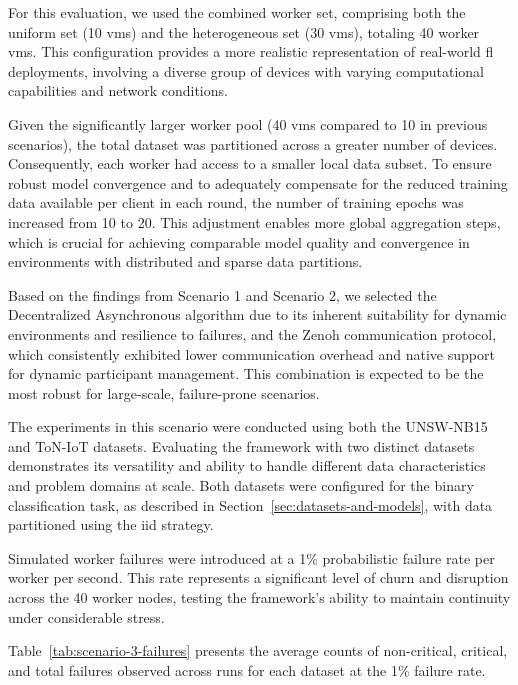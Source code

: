 For this evaluation, we used the combined worker set, comprising both the uniform set (10 \acp{vm}) and the heterogeneous set (30 \acp{vm}), totaling 40 worker \acp{vm}. This configuration provides a more realistic representation of real-world \ac{fl} deployments, involving a diverse group of devices with varying computational capabilities and network conditions.

Given the significantly larger worker pool (40 \acp{vm} compared to 10 in previous scenarios), the total dataset was partitioned across a greater number of devices. Consequently, each worker had access to a smaller local data subset. To ensure robust model convergence and to adequately compensate for the reduced training data available per client in each round, the number of training epochs was increased from 10 to 20. This adjustment enables more global aggregation steps, which is crucial for achieving comparable model quality and convergence in environments with distributed and sparse data partitions.

Based on the findings from Scenario 1 and Scenario 2, we selected the Decentralized Asynchronous algorithm due to its inherent suitability for dynamic environments and resilience to failures, and the Zenoh communication protocol, which consistently exhibited lower communication overhead and native support for dynamic participant management. This combination is expected to be the most robust for large-scale, failure-prone scenarios.

The experiments in this scenario were conducted using both the UNSW-NB15 and ToN-IoT datasets. Evaluating the framework with two distinct datasets demonstrates its versatility and ability to handle different data characteristics and problem domains at scale. Both datasets were configured for the binary classification task, as described in Section~\ref{sec:datasets-and-models}, with data partitioned using the \ac{iid} strategy.

Simulated worker failures were introduced at a 1\% probabilistic failure rate per worker per second. This rate represents a significant level of churn and disruption across the 40 worker nodes, testing the framework's ability to maintain continuity under considerable stress.

Table~\ref{tab:scenario-3-failures} presents the average counts of non-critical, critical, and total failures observed across runs for each dataset at the 1\% failure rate.

